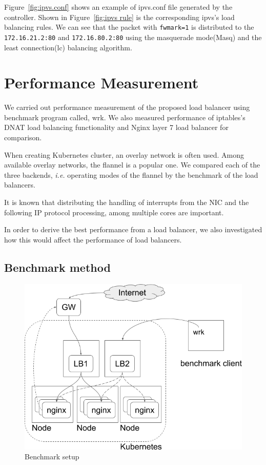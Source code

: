 Figure~\ref{fig:ipvs.conf} shows an example of ipvs.conf file generated by the controller. 
Shown in Figure~\ref{fig:ipvs rule} is the corresponding ipvs's load balancing rules.
We can see that the packet with {\tt fwmark=1}\cite{BertHubert2002} is distributed 
to the {\tt 172.16.21.2:80} and {\tt 172.16.80.2:80} 
using the masquerade mode(Masq)\cite{Zhang2000} and 
the least connection(lc)\cite{Zhang2000} balancing algorithm.   

\section{Performance Measurement}\label{Performance Measurement}

We carried out performance measurement of the proposed load balancer using benchmark program called, wrk\cite{Glozer2016}.
We also measured performance of iptables's DNAT load balancing functionality and Nginx layer 7 load balancer for comparison.

When creating Kubernetes cluster, an overlay network\cite{Sill2016,Marmol2015} is often used. 
Among available overlay networks, the flannel\cite{CoreOSFlannel} is a popular one.
We compared each of the three backends\cite{CoreOSFlannelBackend}, 
{\it i.e.} operating modes of the flannel by the benchmark of the load balancers.

It is known that distributing the handling of interrupts from the NIC 
and the following IP protocol processing, among multiple cores are important.

In order to derive the best performance from a load balancer, 
we also investigated how this would affect the performance of load balancers.

\subsection{Benchmark method}

\begin{figure}
\includegraphics[width=\columnwidth]{Figs/benchmark-schem}
\caption{Benchmark setup}
\label{fig:benchmark-schem}
\end{figure}

